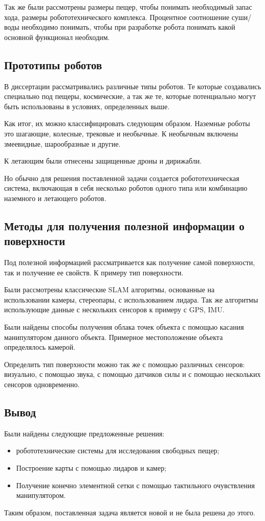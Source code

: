 Так же были рассмотрены размеры пещер, чтобы понимать необходимый запас хода, размеры робототехнического комплекса. Процентное соотношение суши/воды необходимо понимать, чтобы при разработке робота понимать какой основной функционал необходим.

\subsection{Прототипы роботов}

В диссертации рассматривались различные типы роботов. Те которые создавались специально под пещеры, космические, а так же те, которые потенциально могут быть использованы в условиях, определенных выше.

Как итог, их можно классифицировать следующим образом. Наземные роботы это шагающие, колесные, трековые и необычные. К необычным включены змеевидные, шарообразные и другие.

К летающим были отнесены защищенные дроны и дирижабли.

Но обычно для решения поставленной задачи создается робототехническая система, включающая в себя несколько роботов одного типа или комбинацию наземного и летающего роботов.

\subsection{Методы для получения полезной информации о поверхности}

Под полезной информацией рассматривается как получение самой поверхности, так и получение ее свойств. К примеру тип поверхности.

Были рассмотрены классические SLAM алгоритмы, основанные на использовании камеры, стереопары, с использованием лидара. Так же алгоритмы использующие данные с нескольких сенсоров к примеру с GPS, IMU.

Были найдены способы получения облака точек объекта с помощью касания манипулятором данного объекта. Примерное местоположение объекта определялось камерой.

Определить тип поверхности можно так же с помощью различных сенсоров: визуально, с помощью звука, с помощью датчиков силы и с помощью нескольких сенсоров одновременно.

\subsection{Вывод}
Были найдены следующие предложенные решения:
\begin{itemize}
    \item робототехнические системы для исследования свободных пещер;
    \item Построение карты с помощью лидаров и камер;
    \item Получение конечно элементной сетки с помощью тактильного очувствления манипулятором.
\end{itemize}

Таким образом, поставленная задача является новой и не была решена до этого.